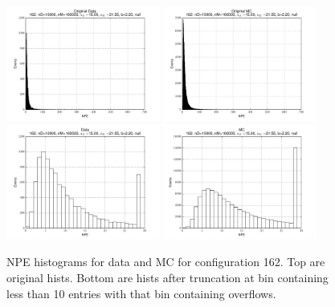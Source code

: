  \begin{figure}[htbp] \begin{center} 
\includegraphics[width=0.45\textwidth]{../FIGURES/162/FIG_Original_Data.pdf} 
\includegraphics[width=0.45\textwidth]{../FIGURES/162/FIG_Original_MC.pdf} 
\includegraphics[width=0.45\textwidth]{../FIGURES/162/FIG_Data.pdf} 
\includegraphics[width=0.45\textwidth]{../FIGURES/162/FIG_MC.pdf} 
\caption{NPE histograms for data and MC for configuration 162. Top are original hists. Bottom are hists after truncation at bin containing less than 10 entries with that bin containing overflows.} 
\label{tab:npe_162} 
\end{center} \end{figure} 
\clearpage
 